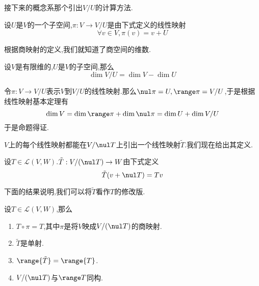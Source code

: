 \documentclass{ctexart}
\begin{document}
接下来的概念系那个引出$V/U$的计算方法.
\begin{definition}[2.5 定义:商映射]
    设$U$是$V$的一个子空间,$\pi:V\to V/U$是由下式定义的线性映射
    $$\forall v\in V,\pi(v)=v+U$$
\end{definition}\noindent
根据商映射的定义,我们就知道了商空间的维数.
\begin{formal}[2.6 商空间的维数]
    设$V$是有限维的,$U$是$V$的子空间,那么
    $$\dim V/U=\dim V-\dim U$$
\end{formal}
\begin{solution}[Proof.]
    令$\pi:V\to V/U$表示$V$到$V/U$的线性映射.那么$\nul\pi=U,\range\pi=V/U$,于是根据线性映射基本定理有
    $$\dim V=\dim\range\pi+\dim\nul\pi=\dim U+\dim V/U$$
    于是命题得证.
\end{solution}\noindent
$V$上的每个线性映射都能在$V/\nul T$上引出一个线性映射$\tilde{T}$.我们现在给出其定义.
\begin{definition}[2.7 记号:$\tilde{T}$]
    设$T\in\mathcal{L}(V,W)$.$\tilde{T}:V/(\nul T)\to W$由下式定义
    $$\tilde{T}(v+\nul T)=Tv$$
\end{definition}
下面的结果说明,我们可以将$\tilde{T}$看作$T$的修改版.
\begin{formal}
    设$T\in\mathcal{L}(V,W)$,那么
    \begin{enumerate}[label=\tbf{(\arabic*)}]
        \item $T\circ\pi=T$,其中$\pi$是将$V$映成$V/(\nul T)$的商映射.
        \item $\tilde{T}$是单射.
        \item $\range{\tilde{T}}=\range{T}$.
        \item $V/(\nul T)$与$\range T$同构.
    \end{enumerate}
\end{formal}
\end{document}
